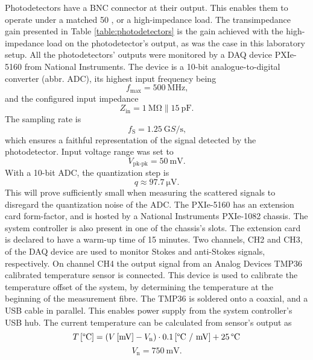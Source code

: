 \documentclass{standalone}
\begin{document}
Photodetectors have a BNC connector at their output. This enables them to operate under a matched 50 \textOmega, or a high-impedance load. The transimpedance gain presented in Table \ref{table:photodetectors} is the gain achieved with the high-impedance load on the photodetector's output, as was the case in this laboratory setup. All the photodetectors' outputs were monitored by a DAQ device PXIe-5160 from National Instruments. The device is a 10-bit analogue-to-digital converter (abbr. ADC), its highest input frequency being \cite{datasheet:daq}
\begin{equation}
f_\textrm{max} = \SI{500}{\mega \hertz} \textrm{,}
\end{equation}
and the configured input impedance
\begin{equation}
Z_\textrm{in} = \SI{1}{\mega \ohm} \| \SI{15}{\pico \farad} \textrm{.}
\end{equation}
The sampling rate is
\begin{equation}
f_\textrm{S} = \SI{1.25}{\giga S / \second} \textrm{,}
\end{equation}
which ensures a faithful representation of the signal detected by the photodetector. Input voltage range was set to
\begin{equation}
V_\textrm{pk-pk} = \SI{50}{\milli \volt} \textrm{.}
\end{equation}
With a 10-bit ADC, the quantization step is
\begin{equation}
q \approx \SI{97.7}{\micro \volt} \textrm{.}
\end{equation}
This will prove sufficiently small when measuring the scattered signals to disregard the quantization noise of the ADC. The PXIe-5160 has an extension card form-factor, and is hosted by a National Instruments PXIe-1082 chassis. The system controller is also present in one of the chassis's slots. The extension card is declared to have a warm-up time of 15 minutes. Two channels, CH2 and CH3, of the DAQ device are used to monitor Stokes and anti-Stokes signals, respectively. On channel CH4 the output signal from an Analog Devices TMP36 calibrated temperature sensor is connected. This device is used to calibrate the temperature offset of the system, by determining the temperature at the beginning of the measurement fibre. The TMP36 is soldered onto a coaxial, and a USB cable in parallel. This enables power supply from the system controller's USB hub. The current temperature can be calculated from sensor's output as \cite{datasheet:tmp36}
\begin{equation}
T \, \textrm{[\textdegree C]} = \left( V \, \textrm{[mV]} - V_\textrm{n} \right) \cdot 0.1 \, \textrm{[\textdegree C / mV]} + 25 \, \textrm{\textdegree C}
\end{equation}
\begin{equation}
V_\textrm{n} = \SI{750}{\milli \volt} \textrm{.}
\end{equation}
\end{document}
